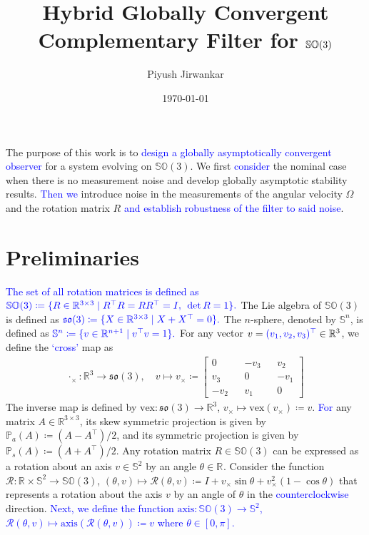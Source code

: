 \documentclass{article}
\title{Hybrid Globally Convergent Complementary Filter for $\SOthree$}
\author{Piyush Jirwankar}
\date{\today}
\newcommand{\SOthree}{\mathbb{SO}(3)}
\newcommand{\sothree}{\mathfrak{so}(3)}
\newcommand{\axis}[1]{\text{axis}(#1)}
\newcommand{\R}[1]{\mathbb{R}^{#1}}
\newcommand{\vex}[1]{\text{vex}\left(#1\right)}
\newcommand{\textblue}[1]{\textcolor{blue}{#1}}
\newcommand{\cross}[1]{{#1}_\times}
\begin{document}
\maketitle

The purpose of this work is to \textblue{design a globally asymptotically convergent observer} for a system evolving on $\SOthree$. We first \textblue{consider} the nominal case when there is no measurement noise and develop globally asymptotic stability results. \textblue{Then we} introduce noise in the measurements of the angular velocity $\Omega$ and the rotation matrix $R$ \textblue{and establish robustness of the filter to said noise}. 

\section{Preliminaries}


\textblue{The set of all rotation matrices is defined as} $\textblue{\SOthree\coloneqq  \{R\in\R{3\times 3} \mid R^\top R = RR^\top = I,\:\: \det R = 1\}.}$ The Lie algebra of $\SOthree$ is defined as $\textblue{\sothree\coloneqq \{X\in\R{3\times 3}\mid X + X^\top = 0\}.}$
The $n$-sphere, denoted by $\mathbb{S}^n$, is defined as $\textblue{\mathbb{S}^n\coloneqq \{v\in \R{n+1}\mid v^\top v = 1\}.}$
For any vector $v = \textblue{(v_1, v_2, v_3)^\top}\in\R{3}$, we define the \textblue{`cross'} map as 
\begin{align}
    \cross{\cdot} : \R{3}\to \sothree, \quad v \mapsto \cross{v} \coloneqq \begin{bmatrix}
        0 && -v_3 && v_2\\
        v_3 && 0 && -v_1\\
        -v_2 && v_1 && 0
    \end{bmatrix}
\end{align}
The inverse map is defined by $\text{vex} : \sothree \to \R{3}$, $\cross{v} \mapsto \vex{\cross{v}}\coloneqq v$. \textblue{For} any matrix $A\in \R{3\times 3}$, its skew symmetric projection is given by $\mathbb{P}_a(A) \coloneqq (A - A^\top)/2$, and its symmetric projection is given by $\mathbb{P}_s(A) \coloneqq (A + A^\top)/2$. Any rotation matrix $R\in\SOthree$ can be expressed as a rotation about an axis $v\in\mathbb{S}^2$ by an angle $\theta\in\R{}$. Consider the function $\mathcal{R}:\R{}\times \mathbb{S}^2 \to \SOthree$, $(\theta, v)\mapsto \mathcal{R}(\theta, v)\coloneqq I + \cross{v}\sin\theta  + \cross{v}^2(1 - \cos{\theta})$ that represents a rotation about the axis $v$ by an angle of $\theta$ in the \textblue{counterclockwise} direction. \textblue{Next, we define the function $\text{axis} : \SOthree\to \mathbb{S}^2$, $\mathcal{R}(\theta, v)\mapsto \axis{\mathcal{R}(\theta, v)} \coloneqq v$ where $\theta\in [0,\pi]$.}
\end{document}
